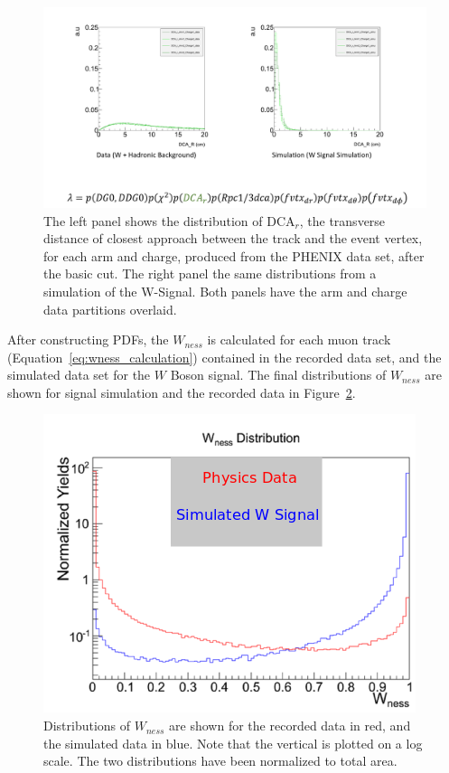 \begin{figure}[ht]
  \centering
  \includegraphics[width=\linewidth,trim=4 70 4 4,clip]{./figures/pdf_dcar.png}
  \caption{
		The left panel shows the distribution of DCA$_r$, the transverse distance of
		closest approach between the track and the event vertex, for each arm and
		charge, produced from the PHENIX data set, after the basic cut. The right
		panel the same distributions from a simulation of the W-Signal. Both panels
		have the arm and charge data partitions overlaid.
  }
  \label{fig:pdf_dcar}
\end{figure}

After constructing PDFs, the $W_{ness}$ is calculated for each muon track
(Equation~\ref{eq:wness_calculation}) contained in the recorded data set, and
the simulated data set for the $W$ Boson signal.  The final distributions of
$W_{ness}$ are shown for signal simulation and the recorded data in
Figure~\ref{fig:wness_distribution}.

\begin{figure}[ht]
  \centering
  \includegraphics[width=0.7\linewidth]{./figures/wness_sig_bak.png}
  \caption{
		Distributions of $W_{ness}$ are shown for the recorded data in red, and the
		simulated data in blue. Note that the vertical is plotted on a log scale.
		The two distributions have been normalized to total area. 
  }
  \label{fig:wness_distribution}
\end{figure}

